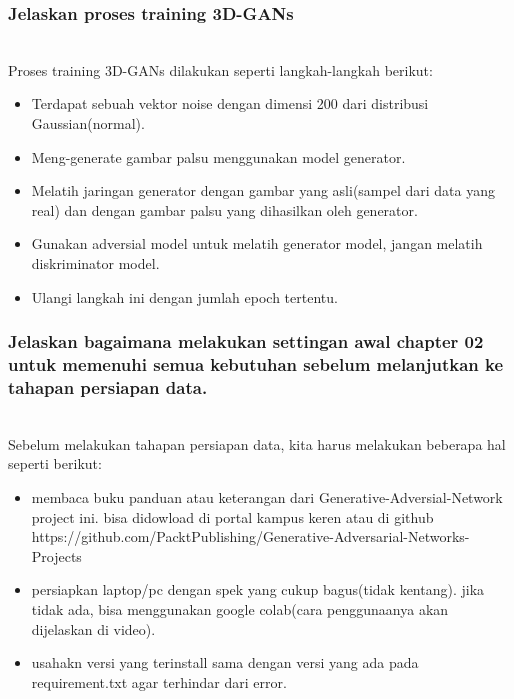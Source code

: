\subsubsection{Jelaskan proses training 3D-GANs}
\hfill\\
Proses training 3D-GANs dilakukan seperti langkah-langkah berikut:
\begin{itemize}
	\item Terdapat sebuah vektor noise dengan dimensi 200 dari distribusi Gaussian(normal).
	\item Meng-generate gambar palsu menggunakan model generator.
	\item Melatih jaringan generator dengan gambar yang asli(sampel dari data yang real) dan dengan gambar palsu yang dihasilkan oleh generator.
	\item Gunakan adversial model untuk melatih generator model, jangan melatih diskriminator model.
	\item Ulangi langkah ini dengan jumlah epoch tertentu.
\end{itemize}
	

\subsubsection{Jelaskan bagaimana melakukan settingan awal chapter 02 untuk memenuhi semua kebutuhan sebelum melanjutkan ke tahapan persiapan data.}
\hfill\\
Sebelum melakukan tahapan persiapan data, kita harus melakukan beberapa hal seperti berikut:
\begin{itemize}
	\item membaca buku panduan atau keterangan dari Generative-Adversial-Network project ini. bisa didowload di portal kampus keren atau di github https://github.com/PacktPublishing/Generative-Adversarial-Networks-Projects
	\item persiapkan laptop/pc dengan spek yang cukup bagus(tidak kentang). jika tidak ada, bisa menggunakan google colab(cara penggunaanya akan dijelaskan di video).
	\item usahakn versi yang terinstall sama dengan versi yang ada pada requirement.txt agar terhindar dari error.
\end{itemize}


